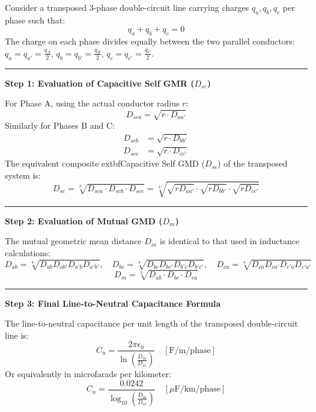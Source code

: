 \documentclass[11pt,a4paper]{article}
\newcommand{\concept}[1]{%
  \vspace{3pt}\noindent\textcolor{AnthGreen}{\rule{3.5pt}{10pt}}\enspace
  \textbf{\sffamily\color{AnthDark}#1}\par\vspace{2pt}%
}
\newenvironment{Deriv}[1][Mathematical Derivation]{\begin{tcolorbox}[derivbox, title=#1]}{\end{tcolorbox}}
\begin{document}
\begin{Deriv}[Complete Step-by-Step Derivation of Capacitance for 3-$\Phi$ Double Circuit]
Consider a transposed 3-phase double-circuit line carrying charges $q_a, q_b, q_c$ per phase such that:
\begin{equation}
  q_a + q_b + q_c = 0
\end{equation}
The charge on each phase divides equally between the two parallel conductors:
$q_a = q_{a'} = \frac{q_A}{2}$, $q_b = q_{b'} = \frac{q_B}{2}$, $q_c = q_{c'} = \frac{q_C}{2}$.

\concept{Step 1: Evaluation of Capacitive Self GMR ($D_{sc}$)}
For Phase A, using the actual conductor radius $r$:
\begin{equation}
  D_{sca} = \sqrt{r \cdot D_{aa'}}
\end{equation}
Similarly for Phases B and C:
\begin{align}
  D_{scb} &= \sqrt{r \cdot D_{bb'}} \\
  D_{scc} &= \sqrt{r \cdot D_{cc'}}
\end{align}
The equivalent composite 	extbf{Capacitive Self GMD ($D_{sc}$)} of the transposed system is:
\begin{equation}
  D_{sc} = \sqrt[3]{D_{sca} \cdot D_{scb} \cdot D_{scc}} = \sqrt[3]{\sqrt{r D_{aa'}} \cdot \sqrt{r D_{bb'}} \cdot \sqrt{r D_{cc'}}}
\end{equation}

\concept{Step 2: Evaluation of Mutual GMD ($D_m$)}
The mutual geometric mean distance $D_m$ is identical to that used in inductance calculations:
\begin{equation}
  D_{ab} = \sqrt[4]{D_{ab} D_{ab'} D_{a'b} D_{a'b'}}, \quad D_{bc} = \sqrt[4]{D_{bc} D_{bc'} D_{b'c} D_{b'c'}}, \quad D_{ca} = \sqrt[4]{D_{ca} D_{ca'} D_{c'a} D_{c'a'}}
\end{equation}
\begin{equation}
  D_m = \sqrt[3]{D_{ab} \cdot D_{bc} \cdot D_{ca}}
\end{equation}

\concept{Step 3: Final Line-to-Neutral Capacitance Formula}
The line-to-neutral capacitance per unit length of the transposed double-circuit line is:
\begin{equation}
  C_n = \frac{2\pi \epsilon_0}{\ln\left( \frac{D_m}{D_{sc}} \right)} \quad [\text{F/m/phase}]
\end{equation}
Or equivalently in microfarads per kilometer:
\begin{equation}
  C_n = \frac{0.0242}{\log_{10}\left( \frac{D_m}{D_{sc}} \right)} \quad [\mu\text{F/km/phase}]
\end{equation}
\end{Deriv}
\end{document}
